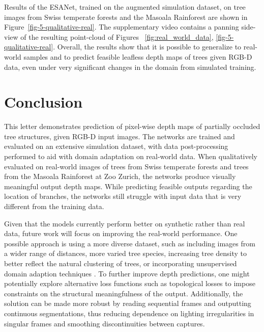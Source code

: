 Results of the ESANet, trained on the augmented simulation dataset, on tree images from Swiss temperate forests and the Masoala Rainforest are shown in Figure~\ref{fig-5-qualitative-real}. The supplementary video contains a panning side-view of the resulting point-cloud of Figures~ \ref{fig:real_world_data}, \ref{fig-5-qualitative-real}. Overall, the results show that it is possible to generalize to real-world samples and to predict feasible leafless depth maps of trees given RGB-D data, even under very significant changes in the domain from simulated training.


\section{Conclusion}
This letter demonstrates prediction of pixel-wise depth maps of partially occluded tree structures, given \mbox{RGB-D} input images. The networks are trained and evaluated on an extensive simulation dataset, with data post-processing performed to aid with domain adaptation on real-world data. When qualitatively evaluated on real-world images of trees from Swiss temperate forests and trees from the Masoala Rainforest at Zoo Zurich, the networks produce visually meaningful output depth maps. While predicting feasible outputs regarding the location of branches, the networks still struggle with input data that is very different from the training data. 

Given that the models currently perform better on synthetic rather than real data, future work will focus on improving the real-world performance. One possible approach is using a more diverse dataset, such as including images from a wider range of distances, more varied tree species, increasing tree density to better reflect the natural clustering of trees, or incorporating unsupervised domain adaption techniques \cite{csurka2021unsupervised_domain_adaption_survey}.
To further improve depth predictions, one might potentially explore alternative loss functions such as topological losses \cite{topological_loss} to impose constraints on the structural meaningfulness of the output. Additionally, the solution can be made more robust by reading sequential frames and outputting continuous segmentations, thus reducing dependence on lighting irregularities in singular frames and smoothing discontinuities between captures.

